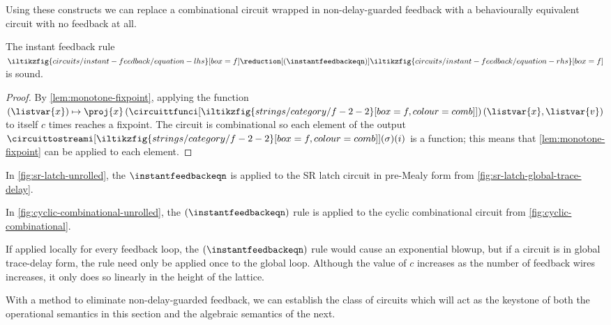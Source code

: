 Using these constructs we can replace a combinational circuit wrapped in
non-delay-guarded feedback with a behaviourally equivalent circuit with no
feedback at all.

\begin{proposition}\label{prop:instant-feedback}
    The instant feedback rule \(
    \iltikzfig{circuits/instant-feedback/equation-lhs}[box=f]
    \reduction[(\instantfeedbackeqn)]
    \iltikzfig{circuits/instant-feedback/equation-rhs}[box=f]
    \) is sound.
\end{proposition}
\begin{proof}
    By \cref{lem:monotone-fixpoint}, applying the function \(
    (\listvar{x}) \mapsto \proj{x}\left(\circuittfunci[
        \iltikzfig{strings/category/f-2-2}[box=f,colour=comb]
    ]\right)(\listvar{x}, \listvar{v})\) to itself \(c\) times reaches a
    fixpoint.
    The circuit is combinational so each element of the output
    \(\circuittostreami[
        \iltikzfig{strings/category/f-2-2}[box=f,colour=comb]
    ](\sigma)(i)\) is a function; this means that \cref{lem:monotone-fixpoint}
    can be applied to each element.
\end{proof}

\begin{example}\label{ex:sr-latch-unrolled}
    In \cref{fig:sr-latch-unrolled}, the \(\instantfeedbackeqn\) is applied to
    the SR latch circuit in pre-Mealy form from
    \cref{fig:sr-latch-global-trace-delay}.
\end{example}

\begin{example}
    In \cref{fig:cyclic-combinational-unrolled}, the \((\instantfeedbackeqn)\)
    rule is applied to the cyclic combinational circuit from
    \cref{fig:cyclic-combinational}.
\end{example}




If applied locally for every feedback loop, the \((\instantfeedbackeqn)\)
rule would cause an exponential blowup, but if a circuit is in global
trace-delay form, the rule need only be applied once to the global loop.
Although the value of \(c\) increases as the number of feedback wires increases,
it only does so linearly in the height of the lattice.

With a method to eliminate non-delay-guarded feedback, we can establish the
class of circuits which will act as the keystone of both the operational
semantics in this section and the algebraic semantics of the next.

